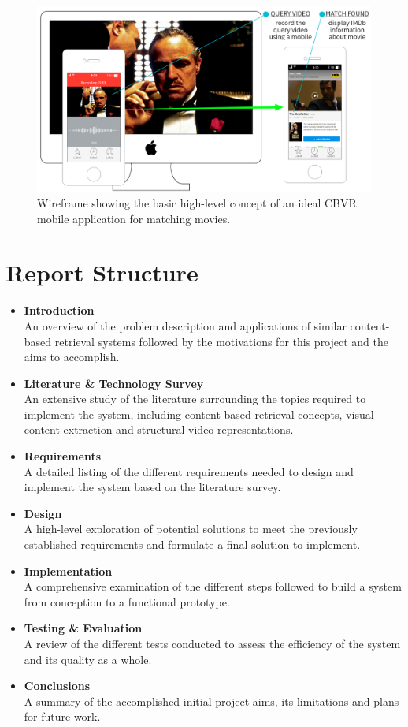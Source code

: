 \begin{figure}[ht]
\centerline{\includegraphics[width=1.15\textwidth]{figures/introduction/system_wireframe.png}}
\caption{\label{fig:wireframe}Wireframe showing the basic high-level concept of an ideal CBVR mobile application for matching movies.}
\end{figure}


\section{Report Structure}

\begin{itemize}
    \item \textbf{Introduction}\\
    An overview of the problem description and applications of similar content-based retrieval systems followed by the motivations for this project and the aims to accomplish.
    \item \textbf{Literature \& Technology Survey}\\
    An extensive study of the literature surrounding the topics required to implement the system, including content-based retrieval concepts, visual content extraction and structural video representations.
    \item \textbf{Requirements}\\
    A detailed listing of the different requirements needed to design and implement the system based on the literature survey.
    \item \textbf{Design}\\
    A high-level exploration of potential solutions to meet the previously established requirements and formulate a final solution to implement.
    \item \textbf{Implementation}\\
    A comprehensive examination of the different steps followed to build a system from conception to a functional prototype.
    \item \textbf{Testing \& Evaluation}\\
    A review of the different tests conducted to assess the efficiency of the system and its quality as a whole.
    \item \textbf{Conclusions}\\
    A summary of the accomplished initial project aims, its limitations and plans for future work.
\end{itemize}